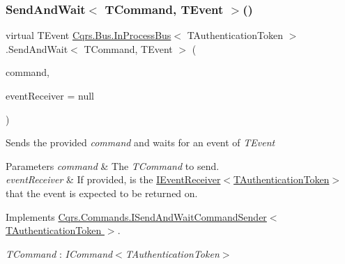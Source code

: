 \subsubsection{\texorpdfstring{Send\+And\+Wait$<$ T\+Command, T\+Event $>$()}{SendAndWait< TCommand, TEvent >()}\hspace{0.1cm}{\footnotesize\ttfamily [1/6]}}
{\footnotesize\ttfamily virtual T\+Event \hyperlink{classCqrs_1_1Bus_1_1InProcessBus}{Cqrs.\+Bus.\+In\+Process\+Bus}$<$ T\+Authentication\+Token $>$.Send\+And\+Wait$<$ T\+Command, T\+Event $>$ (\begin{DoxyParamCaption}\item[{T\+Command}]{command,  }\item[{\hyperlink{interfaceCqrs_1_1Events_1_1IEventReceiver}{I\+Event\+Receiver}$<$ T\+Authentication\+Token $>$}]{event\+Receiver = {\ttfamily null} }\end{DoxyParamCaption})\hspace{0.3cm}{\ttfamily [virtual]}}



Sends the provided {\itshape command}  and waits for an event of {\itshape T\+Event}  


\begin{DoxyParams}{Parameters}
{\em command} & The {\itshape T\+Command}  to send.\\
\hline
{\em event\+Receiver} & If provided, is the \hyperlink{interfaceCqrs_1_1Events_1_1IEventReceiver}{I\+Event\+Receiver$<$\+T\+Authentication\+Token$>$} that the event is expected to be returned on.\\
\hline
\end{DoxyParams}


Implements \hyperlink{interfaceCqrs_1_1Commands_1_1ISendAndWaitCommandSender_ab64dd5144f0688b0e23ffe289d4ffa2e}{Cqrs.\+Commands.\+I\+Send\+And\+Wait\+Command\+Sender$<$ T\+Authentication\+Token $>$}.

\begin{Desc}
\item[Type Constraints]\begin{description}
\item[{\em T\+Command} : {\em I\+Command$<$T\+Authentication\+Token$>$}]\end{description}
\end{Desc}
\mbox{\label{classCqrs_1_1Bus_1_1InProcessBus_a1b3540fe06b60cd601eaff4ea53f5465}} 
